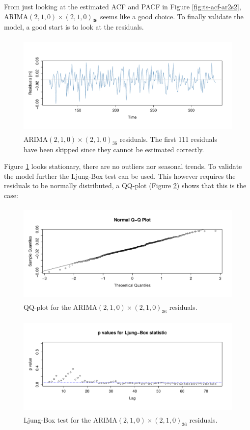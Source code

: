 From just looking at the estimated ACF and PACF in Figure \ref{fig:ts-acf-ar2s2}, ARIMA$(2,1,0) \times (2,1,0)_{36}$ seems like a good choice. To finally validate the model, a good start is to look at the residuals.
\begin{figure}[H]
	\centering
	\includegraphics[height=5cm]{figures/ts-final-residual}
	\caption{ARIMA$(2,1,0) \times (2,1,0)_{36}$ residuals. The first 111 residuals have been skipped since they cannot be estimated correctly.}
	\label{fig:ts-final-residual}
\end{figure}

Figure \ref{fig:ts-final-residual} looks stationary, there are no outliers nor seasonal trends. To validate the model further the Ljung-Box test can be used. This however requires the residuals to be normally distributed, a QQ-plot (Figure \ref{fig:ts-final-qq}) shows that this is the case:
\begin{figure}[H]
	\centering
	\includegraphics[height=5cm]{figures/ts-final-qq}
	\caption{QQ-plot for the ARIMA$(2,1,0) \times (2,1,0)_{36}$ residuals.}
	\label{fig:ts-final-qq}
\end{figure}

\begin{figure}[H]
	\centering
	\includegraphics[height=5cm]{figures/ts-final-ljungbox}
	\caption{Ljung-Box test for the ARIMA$(2,1,0) \times (2,1,0)_{36}$ residuals.}
	\label{fig:ts-final-ljungbox}
\end{figure}

